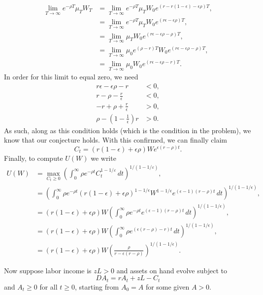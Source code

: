 \documentclass[11pt,english]{article}
\begin{document}
\begin{enumerate}[label = (\alph*)]
\begin{solution}
\begin{align*}
\lim_{T\to \infty} e^{-\rho T} \mu_T W_T &= \lim_{T\to \infty} e^{-\rho T} \mu_T W_0 e^{(r - r(1 - \epsilon) - \epsilon\rho)T},\\
&= \lim_{T\to \infty} e^{-\rho T} \mu_T W_0 e^{(r\epsilon - \epsilon\rho)T},\\
&= \lim_{T\to \infty}  \mu_T W_0 e^{(r\epsilon - \epsilon\rho - \rho)T},\\
&= \lim_{T\to \infty}  \mu_0 e^{(\rho - r)T} W_0 e^{(r\epsilon - \epsilon\rho - \rho)T},\\
&= \lim_{T\to \infty}  \mu_0 W_0 e^{(r\epsilon - \epsilon\rho - r)T}.
\end{align*} In order for this limit to equal zero, we need 
\begin{align*}
r\epsilon - \epsilon\rho - r &< 0,\\
r - \rho - \frac{r}{\epsilon} &< 0,\\
- r + \rho + \frac{r}{\epsilon} &> 0,\\
\rho - \left(1 - \frac{1}{\epsilon}\right)r &> 0.
\end{align*} As such, along as this condition holds (which is the condition in the problem), we know that our conjecture holds. With this confirmed, we can finally claim $$\boxed{C_t = (r(1 - \epsilon) + \epsilon \rho)We^{\epsilon(r - \rho)t}.}$$ Finally, to compute $U(W)$ we write
\begin{align*}
U(W) &=  \max_{C_t \geq 0} \left( \int_0^{\infty} \rho e^{-\rho t} C_t^{1-1/\varepsilon} \, dt \right)^{1/(1-1/\varepsilon)},\\
&= \left(\int_0^\infty \rho e^{-\rho t} (r(1 - \epsilon) + \epsilon \rho)^{1 - 1/\epsilon}W^{1 - 1/\epsilon}e^{(\epsilon - 1)(r - \rho)t}\,dt\right)^{1 / (1 - 1/\epsilon)},\\
&= (r(1 - \epsilon) + \epsilon \rho)W\left(\int_0^\infty \rho e^{-\rho t} e^{(\epsilon - 1)(r - \rho)t}\,dt\right)^{1 / (1 - 1/\epsilon)},\\
&= (r(1 - \epsilon) + \epsilon \rho)W\left(\int_0^\infty \rho e^{(\epsilon(r - \rho) - r)t}\,dt\right)^{1 / (1 - 1/\epsilon)},\\
&= \boxed{(r(1 - \epsilon) + \epsilon \rho)W\left(\frac{\rho}{r - \epsilon(r - \rho)}\right)^{1 / (1 - 1/\epsilon)}.}
\end{align*}
\end{solution}
Now suppose labor income is $zL > 0$ and assets on hand evolve subject to
\[
DA_t = rA_t + zL - C_t
\]
and $A_t \geq 0$ for all $t \geq 0$, starting from $A_0 = A$ for some given $A > 0$.


\end{enumerate}
\end{document}
